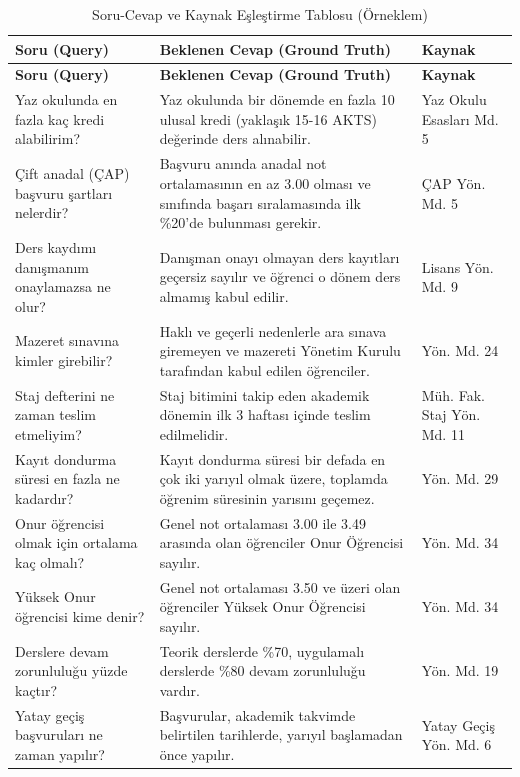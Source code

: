 \documentclass[12pt,a4paper]{report}
\begin{document}
\begin{longtable}{|p{6cm}|p{6cm}|p{2.5cm}|}
\caption{Soru-Cevap ve Kaynak Eşleştirme Tablosu (Örneklem)} \label{tab:golden_dataset} \\
\hline
\textbf{Soru (Query)} & \textbf{Beklenen Cevap (Ground Truth)} & \textbf{Kaynak} \\
\hline
\endfirsthead
\hline
\textbf{Soru (Query)} & \textbf{Beklenen Cevap (Ground Truth)} & \textbf{Kaynak} \\
\hline
\endhead
Yaz okulunda en fazla kaç kredi alabilirim? & Yaz okulunda bir dönemde en fazla 10 ulusal kredi (yaklaşık 15-16 AKTS) değerinde ders alınabilir. & Yaz Okulu Esasları Md. 5 \\
\hline
Çift anadal (ÇAP) başvuru şartları nelerdir? & Başvuru anında anadal not ortalamasının en az 3.00 olması ve sınıfında başarı sıralamasında ilk \%20'de bulunması gerekir. & ÇAP Yön. Md. 5 \\
\hline
Ders kaydımı danışmanım onaylamazsa ne olur? & Danışman onayı olmayan ders kayıtları geçersiz sayılır ve öğrenci o dönem ders almamış kabul edilir. & Lisans Yön. Md. 9 \\
\hline
Mazeret sınavına kimler girebilir? & Haklı ve geçerli nedenlerle ara sınava giremeyen ve mazereti Yönetim Kurulu tarafından kabul edilen öğrenciler. & Yön. Md. 24 \\
\hline
Staj defterini ne zaman teslim etmeliyim? & Staj bitimini takip eden akademik dönemin ilk 3 haftası içinde teslim edilmelidir. & Müh. Fak. Staj Yön. Md. 11 \\
\hline
Kayıt dondurma süresi en fazla ne kadardır? & Kayıt dondurma süresi bir defada en çok iki yarıyıl olmak üzere, toplamda öğrenim süresinin yarısını geçemez. & Yön. Md. 29 \\
\hline
Onur öğrencisi olmak için ortalama kaç olmalı? & Genel not ortalaması 3.00 ile 3.49 arasında olan öğrenciler Onur Öğrencisi sayılır. & Yön. Md. 34 \\
\hline
Yüksek Onur öğrencisi kime denir? & Genel not ortalaması 3.50 ve üzeri olan öğrenciler Yüksek Onur Öğrencisi sayılır. & Yön. Md. 34 \\
\hline
Derslere devam zorunluluğu yüzde kaçtır? & Teorik derslerde \%70, uygulamalı derslerde \%80 devam zorunluluğu vardır. & Yön. Md. 19 \\
\hline
Yatay geçiş başvuruları ne zaman yapılır? & Başvurular, akademik takvimde belirtilen tarihlerde, yarıyıl başlamadan önce yapılır. & Yatay Geçiş Yön. Md. 6 \\
\hline
\end{longtable}
\end{document}
